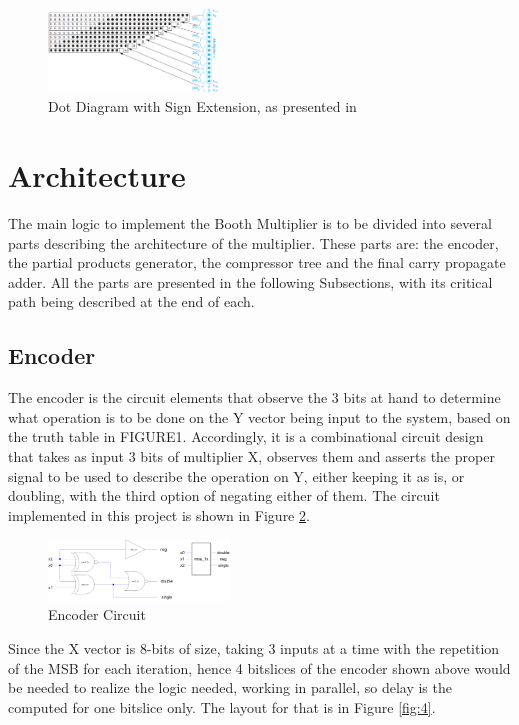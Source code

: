\documentclass[journal]{IEEEtran}
\begin{document}
\begin{figure}[h!]
  \centering
  \includegraphics[width=0.4\textwidth]{2.png}
  \centering
  \caption{Dot Diagram with Sign Extension, as presented in \cite{tb}}
  \label{fig:2}
\end{figure}


\section{Architecture}

The main logic to implement the Booth Multiplier is to be divided into several parts describing the architecture of the multiplier. These parts are: the encoder, the partial products generator, the compressor tree and the final carry propagate adder. All the parts are presented in the following Subsections, with its critical path being described at the end of each.

\subsection{Encoder}

The encoder is the circuit elements that observe the 3 bits at hand to determine what operation is to be done on the Y vector being input to the system, based on the truth table in FIGURE1. Accordingly, it is a combinational circuit design that takes as input 3 bits of multiplier X, observes them and asserts the proper signal to be used to describe the operation on Y, either keeping it as is, or doubling, with the third option of negating either of them. The circuit implemented in this project is shown in Figure \ref{fig:3}.

\begin{figure}[h!]
  \centering
  \includegraphics[width=0.43\textwidth]{3.png}
  \centering
  \caption{Encoder Circuit}
  \label{fig:3}
\end{figure}


Since the X vector is 8-bits of size, taking 3 inputs at a time with the repetition of the MSB for each iteration, hence 4 bitslices of the encoder shown above would be needed to realize the logic needed, working in parallel, so delay is the computed for one bitslice only. The layout for that is in Figure \ref{fig:4}.
\end{document}
